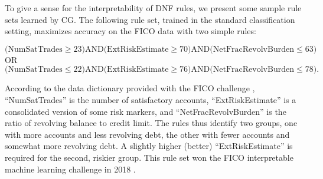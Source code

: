 \documentclass[twoside,11pt]{article}
\begin{document}
To give a sense for the interpretability of DNF rules, we present some sample rule sets learned by CG. The following rule set, trained in the standard classification setting, maximizes accuracy on the FICO data with two simple rules:

{
\centering
\[\big(\mathrm{NumSatTrades} \ge 23\big) \mathrm{ AND } \big( \mathrm{ExtRiskEstimate} \geq 70\big) \mathrm{ AND } \big( \mathrm{NetFracRevolvBurden} \le63\big) \]
OR
\[\big(\mathrm{NumSatTrades} \le 22\big) \mathrm{ AND } \big( \mathrm{ExtRiskEstimate} \geq 76\big) \mathrm{ AND } \big( \mathrm{NetFracRevolvBurden} \le78\big). \]}

According to the data dictionary provided with the FICO challenge \citep{FICO2018}, ``NumSatTrades'' is the number of satisfactory accounts, ``ExtRiskEstimate'' is a consolidated version of some risk markers, and ``NetFracRevolvBurden'' is the ratio of revolving balance to credit limit.  The rules thus identify two groups, one with more accounts and less revolving debt, the other with fewer accounts and somewhat more revolving debt.  A slightly higher (better) ``ExtRiskEstimate'' is required for the second, riskier group. This rule set won the FICO interpretable machine learning challenge in 2018 \citep{FICO2018}. 

\end{document}
